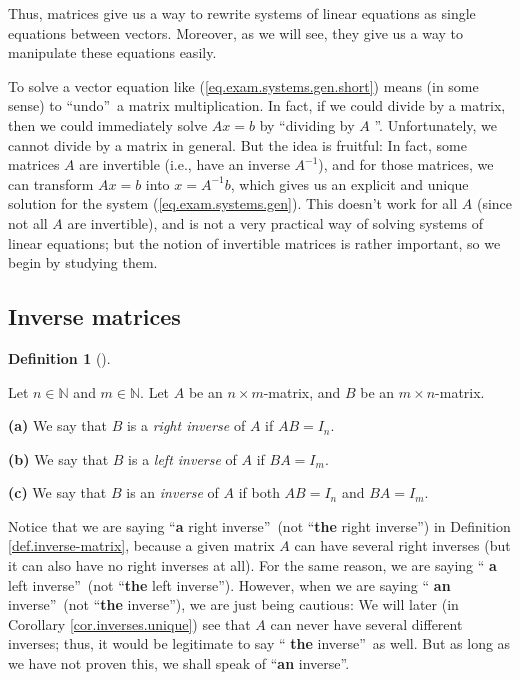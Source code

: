 \documentclass[numbers=enddot,12pt,final,onecolumn,notitlepage]{scrartcl}%
\theoremstyle{definition}
\newtheorem{defi}[theo]{Definition}
\newenvironment{definition}[1][]
{\begin{defi}[#1]\begin{leftbar}}
{\end{leftbar}\end{defi}}
\begin{document}
Thus, matrices give us a way to rewrite systems of linear equations as single
equations between vectors. Moreover, as we will see, they give us a way to
manipulate these equations easily.

To solve a vector equation like (\ref{eq.exam.systems.gen.short}) means (in
some sense) to \textquotedblleft undo\textquotedblright\ a matrix
multiplication. In fact, if we could divide by a matrix, then we could
immediately solve $Ax=b$ by \textquotedblleft dividing by $A$%
\textquotedblright. Unfortunately, we cannot divide by a matrix in general.
But the idea is fruitful: In fact, some matrices $A$ are invertible (i.e.,
have an inverse $A^{-1}$), and for those matrices, we can transform $Ax=b$
into $x=A^{-1}b$, which gives us an explicit and unique solution for the
system (\ref{eq.exam.systems.gen}). This doesn't work for all $A$ (since not
all $A$ are invertible), and is not a very practical way of solving systems of
linear equations; but the notion of invertible matrices is rather important,
so we begin by studying them.

\subsection{Inverse matrices}

\begin{definition}
\label{def.inverse-matrix}Let $n\in\mathbb{N}$ and $m\in\mathbb{N}$. Let $A$
be an $n\times m$-matrix, and $B$ be an $m\times n$-matrix.

\textbf{(a)} We say that $B$ is a \textit{right inverse} of $A$ if $AB=I_{n}$.

\textbf{(b)} We say that $B$ is a \textit{left inverse} of $A$ if $BA=I_{m}$.

\textbf{(c)} We say that $B$ is an \textit{inverse} of $A$ if both $AB=I_{n}$
and $BA=I_{m}$.
\end{definition}

Notice that we are saying \textquotedblleft\textbf{a} right
inverse\textquotedblright\ (not \textquotedblleft\textbf{the} right
inverse\textquotedblright) in Definition \ref{def.inverse-matrix}, because a
given matrix $A$ can have several right inverses (but it can also have no
right inverses at all). For the same reason, we are saying \textquotedblleft%
\textbf{a} left inverse\textquotedblright\ (not \textquotedblleft\textbf{the}
left inverse\textquotedblright). However, when we are saying \textquotedblleft%
\textbf{an} inverse\textquotedblright\ (not \textquotedblleft\textbf{the}
inverse\textquotedblright), we are just being cautious: We will later (in
Corollary \ref{cor.inverses.unique}) see that $A$ can never have several
different inverses; thus, it would be legitimate to say \textquotedblleft%
\textbf{the} inverse\textquotedblright\ as well. But as long as we have not
proven this, we shall speak of \textquotedblleft\textbf{an}
inverse\textquotedblright.
\end{document}
